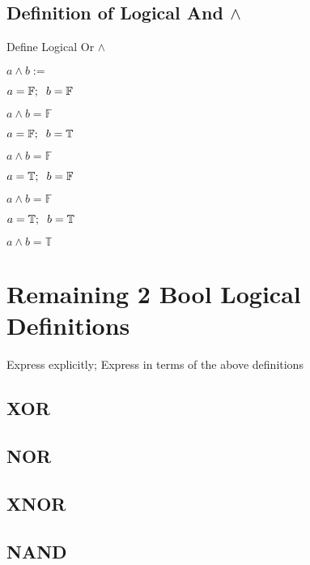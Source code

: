 \documentclass[11pt]{article}
\begin{document}
\subsection{Definition of Logical And $\land$}
\vspace{3mm}
Define Logical Or $\land$
\begin{center}
$
a \land b :=
$
\end{center}
$a = \mathbb{F}; \hspace{2mm} b = \mathbb{F}$
\begin{center}
$
a \land b = \mathbb{F}
$
\end{center}
\vspace{2mm}
$a = \mathbb{F}; \hspace{2mm} b = \mathbb{T}$
\begin{center}
$
a \land b = \mathbb{F}
$
\end{center}
\vspace{2mm}
$a = \mathbb{T}; \hspace{2mm} b = \mathbb{F}$
\begin{center}
$
a \land b = \mathbb{F}
$
\end{center}
\vspace{2mm}
$a = \mathbb{T}; \hspace{2mm} b = \mathbb{T}$
\begin{center}
$
a \land b = \mathbb{T}
$
\end{center}





\section{Remaining 2 Bool Logical Definitions}
Express explicitly; Express in terms of the above definitions
\subsection{XOR}
\subsection{NOR}
\subsection{XNOR}
\subsection{NAND}
\end{document}
